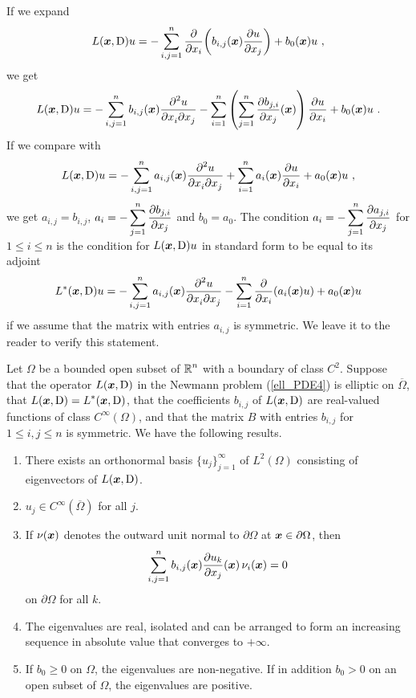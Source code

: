 \begin{rmk}
If we expand
\[
L(\VEC{x}, \diff)u = -\sum_{i,j=1}^n
\pdfdx{\left( b_{i,j}(\VEC{x}) \pdydx{u}{x_j} \right)}{x_i} + b_0(\VEC{x})u \ ,
\]
we get
\[
L(\VEC{x}, \diff)u = -\sum_{i,j=1}^n b_{i,j}(\VEC{x})
\pdydxnm{u}{x_i}{x_j}{2}{}{}
- \sum_{i=1}^n \left( \sum_{j=1}^n \pdydx{b_{j,i}}{x_j}(\VEC{x}) \right)
\pdydx{u}{x_i} + b_0(\VEC{x})u \ .
\]
If we compare with
\[
L(\VEC{x}, \diff)u = -\sum_{i,j=1}^n a_{i,j}(\VEC{x})
\pdydxnm{u}{x_i}{x_j}{2}{}{}
+ \sum_{i=1}^n a_i(\VEC{x}) \pdydx{u}{x_i} + a_0(\VEC{x})u \ ,
\]
we get $a_{i,j} = b_{i,j}$, 
$\displaystyle a_i = - \sum_{j=1}^n \pdydx{b_{j,i}}{x_j}$ and
$b_0 = a_0$.  The condition
$\displaystyle a_i = - \sum_{j=1}^n \pdydx{a_{j,i}}{x_j}$ for
$1 \leq i \leq n$ is the condition for $L(\VEC{x}, \diff)u$ in
standard form to be equal to its adjoint
\[
L^\ast(\VEC{x}, \diff)u = -\sum_{i,j=1}^n a_{i,j}(\VEC{x})
\pdydxnm{u}{x_i}{x_j}{2}{}{}
- \sum_{i=1}^n \pdfdx{\left( a_i(\VEC{x}) u\right)}{x_i} +
a_0(\VEC{x})u
\]
if we assume that the matrix with entries $a_{i,j}$ is symmetric.  We
leave it to the reader to verify this statement.
\end{rmk}

\begin{theorem} \label{ell_exist_th5}
Let $\Omega$ be a bounded open subset of $\displaystyle \RR^n$ with a boundary
of class $\displaystyle C^2$.
Suppose that the operator $L(\VEC{x},\diff)$ in the Newmann problem
(\ref{ell_PDE4}) is elliptic on $\overline{\Omega}$, that
$\displaystyle L(\VEC{x},\diff)=L^\ast(\VEC{x},\diff)$, that the
coefficients $b_{i,j}$ of $L(\VEC{x},\diff)$ are real-valued
functions of class $C^\infty(\Omega)$, and that the \nn matrix $B$ with entries
$b_{i,j}$ for $1\leq i,j\leq n$ is symmetric.  We have the following results.
\begin{enumerate}
\item There exists an orthonormal basis $\displaystyle \{u_j\}_{j=1}^\infty$ of
$\displaystyle L^2(\Omega)$ consisting of eigenvectors of $L(\VEC{x},\diff)$.
\item $\displaystyle u_j \in C^\infty(\overline{\Omega})$ for all $j$.
\item If $\nu(\VEC{x})$ denotes the outward unit normal to
$\partial \Omega$ at $\VEC{x} \in \partial \Omega$, then
\[
\sum_{i,j=1}^n b_{i,j}(\VEC{x}) \pdydx{u_k}{x_j}(\VEC{x})\,\nu_i(\VEC{x})= 0
\]
on $\partial \Omega$ for all $k$.
\item The eigenvalues are real, isolated and can be arranged to form an
increasing sequence in absolute value that converges to $+\infty$.
\item If $b_0\geq 0$ on $\Omega$, the eigenvalues are non-negative.
If in addition $b_0>0$ on an open subset of $\Omega$, the eigenvalues
are positive.
\end{enumerate}
\end{theorem}

